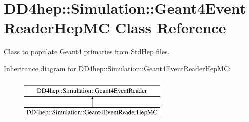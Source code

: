 \hypertarget{class_d_d4hep_1_1_simulation_1_1_geant4_event_reader_hep_m_c}{}\section{D\+D4hep\+:\+:Simulation\+:\+:Geant4\+Event\+Reader\+Hep\+MC Class Reference}
\label{class_d_d4hep_1_1_simulation_1_1_geant4_event_reader_hep_m_c}


Class to populate Geant4 primaries from Std\+Hep files.  


Inheritance diagram for D\+D4hep\+:\+:Simulation\+:\+:Geant4\+Event\+Reader\+Hep\+MC\+:\begin{figure}[H]
\begin{center}
\leavevmode
\includegraphics[height=2.000000cm]{class_d_d4hep_1_1_simulation_1_1_geant4_event_reader_hep_m_c}
\end{center}
\end{figure}
